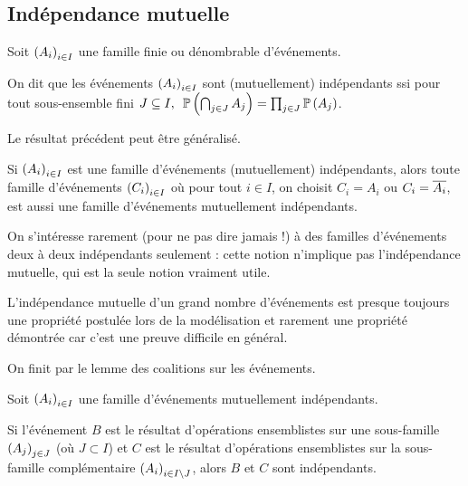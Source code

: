 \subsection{Indépendance mutuelle}

\begin{defi}
Soit \(\left(A_i\right)_{i\in I}\) une famille finie ou dénombrable d'événements.

On dit que les événements \(\left(A_i\right)_{i\in I}\) sont (mutuellement) indépendants ssi pour tout sous-ensemble fini \(\quantifs{J\subset I}\proba{\biginter_{j\in J}A_j}=\prod_{j\in J}\proba{A_j}\).
\end{defi}

Le résultat précédent peut être généralisé.

\begin{prop}
Si \(\left(A_i\right)_{i\in I}\) est une famille d'événements (mutuellement) indépendants, alors toute famille d'événements \(\left(C_i\right)_{i\in I}\) où pour tout \(i\in I\), on choisit \(C_i=A_i\) ou \(C_i=\overline{A_i}\), est aussi une famille d'événements mutuellement indépendants.
\end{prop}

\begin{rem}
On s'intéresse rarement (pour ne pas dire jamais !) à des familles d'événements deux à deux indépendants seulement : cette notion n'implique pas l'indépendance mutuelle, qui est la seule notion vraiment utile.
\end{rem}

\begin{rem}
L'indépendance mutuelle d'un grand nombre d'événements est presque toujours une propriété postulée lors de la modélisation et rarement une propriété démontrée car c'est une preuve difficile en général.
\end{rem}

On finit par le lemme des coalitions sur les événements.

\begin{theo}
Soit \(\left(A_i\right)_{i\in I}\) une famille d'événements mutuellement indépendants.

Si l'événement \(B\) est le résultat d'opérations ensemblistes sur une sous-famille \(\left(A_j\right)_{j\in J}\) (où \(J\subset I\)) et \(C\) est le résultat d'opérations ensemblistes sur la sous-famille complémentaire \(\left(A_i\right)_{i\in I\setminus J}\), alors \(B\) et \(C\) sont indépendants.
\end{theo}
